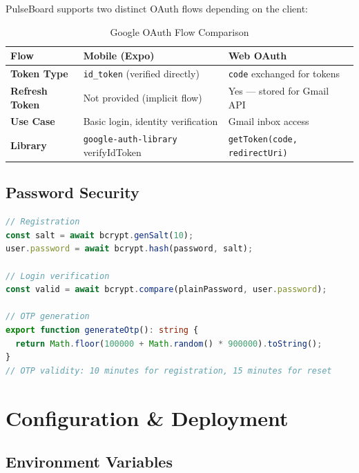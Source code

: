 \documentclass[12pt,a4paper]{report}
\begin{document}
PulseBoard supports two distinct OAuth flows depending on the client:

\begin{table}[H]
\centering
{}
\begin{tabularx}{\textwidth}{>{\bfseries}l X X}
\rowcolor{tableheadbg}
\color{white}Flow & \color{white}Mobile (Expo) & \color{white}Web OAuth \\
\toprule
Token Type   & \texttt{id\_token} (verified directly)       & \texttt{code} exchanged for tokens \\
Refresh Token & Not provided (implicit flow)                & Yes — stored for Gmail API \\
Use Case     & Basic login, identity verification          & Gmail inbox access \\
Library      & \texttt{google-auth-library} verifyIdToken  & \texttt{getToken(code, redirectUri)} \\
\bottomrule
\end{tabularx}
\caption{Google OAuth Flow Comparison}
\end{table}

\section{Password Security}

\begin{lstlisting}[language=TypeScript, caption={Password Hashing (bcryptjs)}]
// Registration
const salt = await bcrypt.genSalt(10);
user.password = await bcrypt.hash(password, salt);

// Login verification
const valid = await bcrypt.compare(plainPassword, user.password);

// OTP generation
export function generateOtp(): string {
  return Math.floor(100000 + Math.random() * 900000).toString();
}
// OTP validity: 10 minutes for registration, 15 minutes for reset
\end{lstlisting}

\chapter{Configuration \& Deployment}

\section{Environment Variables}
\end{document}
